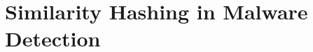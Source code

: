 \documentclass[../../main.tex]{subfiles}
\begin{document}




    
    


\newpage
\section{Similarity Hashing in Malware Detection}
\end{document}
